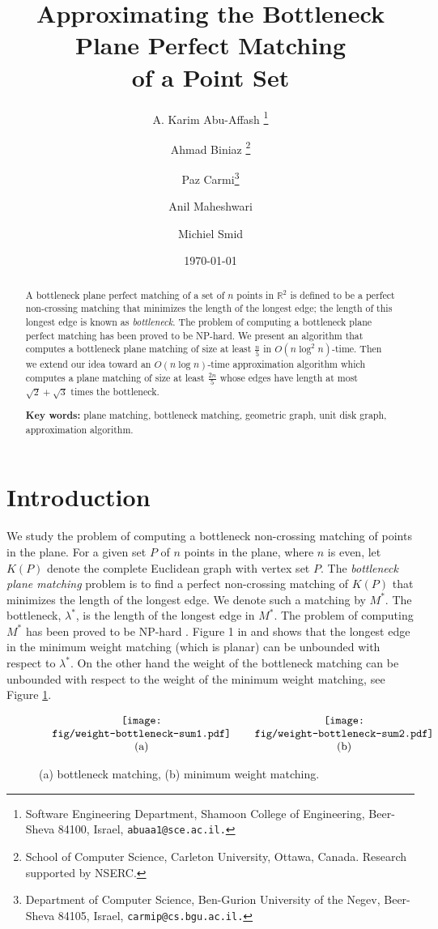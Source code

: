 \documentclass[11pt,a4paper]{article}
\title{Approximating the Bottleneck Plane Perfect Matching\\of a Point Set}
\author{
A. Karim Abu-Affash \thanks{Software Engineering Department, Shamoon College of Engineering, Beer-Sheva 84100, Israel, {\tt abuaa1@sce.ac.il.}} 
\and 
Ahmad Biniaz
\thanks{School of Computer Science, Carleton University, 
                    Ottawa, Canada. Research supported by NSERC.}
\and 
Paz Carmi\thanks{Department of Computer Science, Ben-Gurion University of the Negev, Beer-Sheva 84105, Israel, {\tt carmip@cs.bgu.ac.il.}}
\and
Anil Maheshwari\footnotemark[2]
\and 
Michiel Smid\footnotemark[2]
}
\date{\today}
\newcommand{\MOPT}{M^*}
\newcommand{\btopt}{\lambda^*}
\begin{document}
\maketitle

\begin{abstract}
A bottleneck plane perfect matching of a set of $n$ points in $\mathbb{R}^2$ is defined to be a perfect non-crossing matching that minimizes the length of the longest edge; the length of this longest edge is known as {\em bottleneck}. The problem of computing a bottleneck plane perfect matching has been proved to be NP-hard. 
We present an algorithm that computes a bottleneck plane matching of size at least $\frac{n}{5}$ in $O(n \log^2 n)$-time.
Then we extend our idea toward an $O(n\log n)$-time approximation algorithm which computes a plane matching of size at least $\frac{2n}{5}$ whose edges have length at most $\sqrt{2}+\sqrt{3}$ times the bottleneck.

{\bf Key words:} plane matching, bottleneck matching, geometric graph, unit disk graph, approximation algorithm.

\end{abstract}


\section{Introduction}
We study the problem of computing a bottleneck non-crossing matching of points in the plane.
For a given set $P$ of $n$ points in the plane, where $n$ is even, let $K(P)$ denote the complete Euclidean graph with vertex set $P$. The {\em bottleneck plane matching} problem is to find a perfect non-crossing matching of $K(P)$ that minimizes the length of the longest edge. We denote such a matching by $\MOPT$. The bottleneck, $\btopt$, is the length of the longest edge in $\MOPT$. The problem of computing $\MOPT$ 
has been proved to be NP-hard \cite{Abu-Affash2014}. 
Figure 1 in \cite{Abu-Affash2014} and \cite{Carlsson2010} shows that the longest edge in the minimum weight matching (which is planar) can be unbounded with respect to $\btopt$. On the other hand the weight of the bottleneck matching can be unbounded with respect to the weight of the minimum weight matching, see Figure \ref{weight}.

\begin{figure}[ht]
  \centering
\setlength{\tabcolsep}{0in}
  $\begin{tabular}{cc}
 \multicolumn{1}{m{.5\columnwidth}}{\centering\texttt{[image: fig/weight-bottleneck-sum1.pdf]}}
&\multicolumn{1}{m{.5\columnwidth}}{\centering\texttt{[image: fig/weight-bottleneck-sum2.pdf]}}\\
(a) & (b)
  \end{tabular}$
  \caption{(a) bottleneck matching, (b) minimum weight matching.}
\label{weight}
\end{figure}
\end{document}
